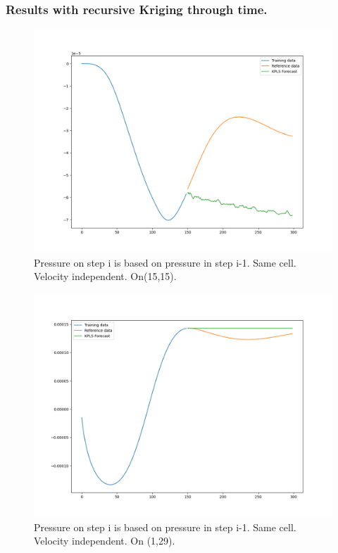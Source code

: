 \documentclass[xcolor=dvipsnames,10pt,aspectratio=169]{beamer}
\begin{document}
\begin{frame}\frametitle{Results with recursive Kriging through time.}
	\begin{minipage}[h!]{0.49\textwidth}
		\begin{figure}
			\centering
			\includegraphics[clip=true, scale=0.25]{figuras/preassure_15_15_krigin_100.png}
	 		\caption{Pressure on step i is based on pressure in step i-1. Same cell. Velocity independent. On(15,15).}
		\end{figure}
	\end{minipage}
	\begin{minipage}[h!]{0.5\textwidth}
		\begin{figure}
			\centering
			\includegraphics[clip=true, scale=0.25]{figuras/preassure_1_29_krigin_100.png}
	 		\caption{Pressure on step i is based on pressure in step i-1. Same cell. Velocity independent. On (1,29).}
		\end{figure}
	\end{minipage}
\end{frame}
\end{document}
